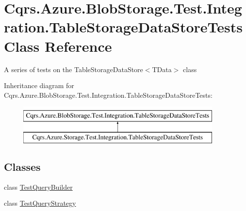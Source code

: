 \hypertarget{classCqrs_1_1Azure_1_1BlobStorage_1_1Test_1_1Integration_1_1TableStorageDataStoreTests}{}\section{Cqrs.\+Azure.\+Blob\+Storage.\+Test.\+Integration.\+Table\+Storage\+Data\+Store\+Tests Class Reference}
\label{classCqrs_1_1Azure_1_1BlobStorage_1_1Test_1_1Integration_1_1TableStorageDataStoreTests}


A series of tests on the Table\+Storage\+Data\+Store$<$\+T\+Data$>$ class  


Inheritance diagram for Cqrs.\+Azure.\+Blob\+Storage.\+Test.\+Integration.\+Table\+Storage\+Data\+Store\+Tests\+:\begin{figure}[H]
\begin{center}
\leavevmode
\includegraphics[height=2.000000cm]{classCqrs_1_1Azure_1_1BlobStorage_1_1Test_1_1Integration_1_1TableStorageDataStoreTests}
\end{center}
\end{figure}
\subsection*{Classes}
\begin{DoxyCompactItemize}
\item 
class \hyperlink{classCqrs_1_1Azure_1_1BlobStorage_1_1Test_1_1Integration_1_1TableStorageDataStoreTests_1_1TestQueryBuilder}{Test\+Query\+Builder}
\item 
class \hyperlink{classCqrs_1_1Azure_1_1BlobStorage_1_1Test_1_1Integration_1_1TableStorageDataStoreTests_1_1TestQueryStrategy}{Test\+Query\+Strategy}
\end{DoxyCompactItemize}
